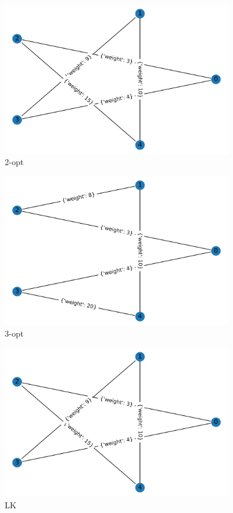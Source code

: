 \documentclass[8pt]{beamer}
\begin{document}
\begin{frame}
\begin{figure}
  \includegraphics[width=10cm]{primeri/primer1_2opt.png}
\caption{2-opt}
\label{Slika 2}
\end{figure}
\end{frame}

\begin{frame}
  \begin{figure}
  \includegraphics[width=10cm]{primeri/primer1_3opt.png}
 	\caption{3-opt}
	\label{Slika 3}
	\end{figure}
\end{frame}

\begin{frame}
\begin{figure}
  \includegraphics[width=10cm]{primeri/primer1_lk.png}
\caption{LK}
\label{Slika 4}
\end{figure}
\end{frame}
\end{document}
